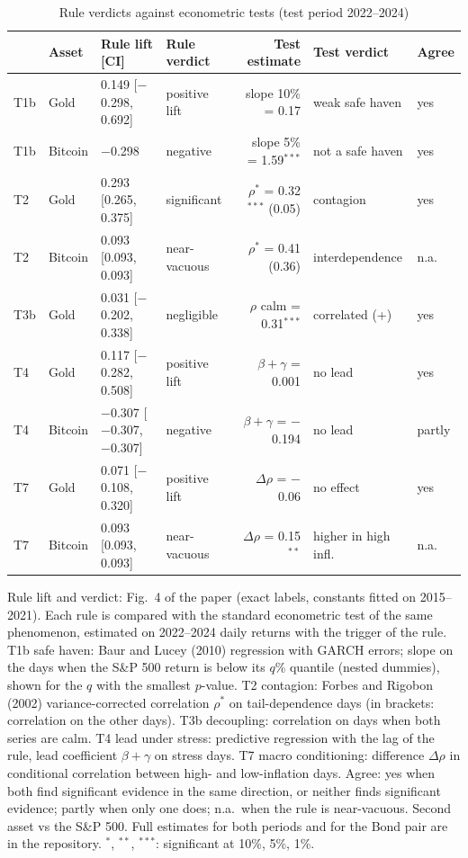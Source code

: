 \begin{table}[t]
\centering
\scriptsize
\setlength{\tabcolsep}{2.2pt}
\caption{Rule verdicts against econometric tests (test period 2022--2024)}
\label{tab:benchmark}
\begin{tabular}{llllrll}
\toprule
 & Asset & Rule lift [CI] & Rule verdict & Test estimate & Test verdict & Agree \\
\midrule
T1b & Gold & 0.149 [$-$0.298, 0.692] & positive lift & slope 10\% = 0.17 & weak safe haven & yes \\
T1b & Bitcoin & $-$0.298 & negative & slope 5\% = 1.59$^{***}$ & not a safe haven & yes \\
T2 & Gold & 0.293 [0.265, 0.375] & significant & $\rho^{*}$ = 0.32$^{***}$ (0.05) & contagion & yes \\
T2 & Bitcoin & 0.093 [0.093, 0.093] & near-vacuous & $\rho^{*}$ = 0.41 (0.36) & interdependence & n.a. \\
T3b & Gold & 0.031 [$-$0.202, 0.338] & negligible & $\rho$ calm = 0.31$^{***}$ & correlated (+) & yes \\
T4 & Gold & 0.117 [$-$0.282, 0.508] & positive lift & $\beta+\gamma$ = 0.001 & no lead & yes \\
T4 & Bitcoin & $-$0.307 [$-$0.307, $-$0.307] & negative & $\beta+\gamma$ = $-$0.194 & no lead & partly \\
T7 & Gold & 0.071 [$-$0.108, 0.320] & positive lift & $\Delta\rho$ = $-$0.06 & no effect & yes \\
T7 & Bitcoin & 0.093 [0.093, 0.093] & near-vacuous & $\Delta\rho$ = 0.15$^{**}$ & higher in high infl. & n.a. \\
\bottomrule
\end{tabular}
\par\smallskip
\parbox{\linewidth}{\footnotesize Rule lift and verdict: Fig.~4 of the paper (exact labels, constants fitted on 2015--2021). Each rule is compared with the standard econometric test of the same phenomenon, estimated on 2022--2024 daily returns with the trigger of the rule. T1b safe haven: Baur and Lucey (2010) regression with GARCH errors; slope on the days when the S\&P 500 return is below its $q$\% quantile (nested dummies), shown for the $q$ with the smallest $p$-value. T2 contagion: Forbes and Rigobon (2002) variance-corrected correlation $\rho^{*}$ on tail-dependence days (in brackets: correlation on the other days). T3b decoupling: correlation on days when both series are calm. T4 lead under stress: predictive regression with the lag of the rule, lead coefficient $\beta+\gamma$ on stress days. T7 macro conditioning: difference $\Delta\rho$ in conditional correlation between high- and low-inflation days. Agree: yes when both find significant evidence in the same direction, or neither finds significant evidence; partly when only one does; n.a.\ when the rule is near-vacuous. Second asset vs the S\&P 500. Full estimates for both periods and for the Bond pair are in the repository. $^{*}$, $^{**}$, $^{***}$: significant at 10\%, 5\%, 1\%.}
\end{table}
